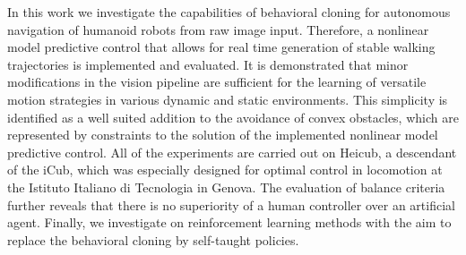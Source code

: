 In this work we investigate the capabilities of behavioral cloning for autonomous navigation of humanoid robots from raw image input. Therefore, a nonlinear model predictive control that allows for real time generation of stable walking trajectories is implemented and evaluated. It is demonstrated that minor modifications in the vision pipeline are sufficient for the learning of versatile motion strategies in various dynamic and static environments. This simplicity is identified as a well suited addition to the avoidance of convex obstacles, which are represented by constraints to the solution of the implemented nonlinear model predictive control. All of the experiments are carried out on Heicub, a descendant of the iCub, which was especially designed for optimal control in locomotion at the Istituto Italiano di Tecnologia in Genova. The evaluation of balance criteria further reveals that there is no superiority of a human controller over an artificial agent. Finally, we investigate on reinforcement learning methods with the aim to replace the behavioral cloning by self-taught policies.
